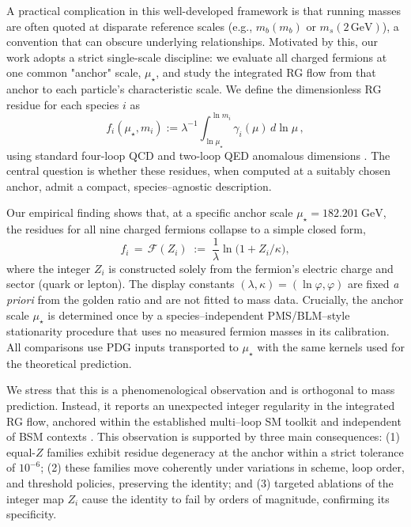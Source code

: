 \documentclass[aps,prd,onecolumn,amsmath,amssymb,superscriptaddress,nofootinbib,showpacs,showkeys]{revtex4-2}
\begin{document}
A practical complication in this well-developed framework is that running masses are often quoted at disparate reference scales (e.g., $m_b(m_b)$ or $m_s(2\,\mathrm{GeV})$), a convention that can obscure underlying relationships. Motivated by this, our work adopts a strict single-scale discipline: we evaluate all charged fermions at one common "anchor" scale, $\mu_\star$, and study the integrated RG flow from that anchor to each particle's characteristic scale. We define the dimensionless RG residue for each species $i$ as
\[
f_i(\mu_\star,m_i):=\lambda^{-1}\!\int_{\ln\mu_\star}^{\ln m_i}\gamma_i(\mu)\,d\ln\mu\,,
\]
using standard four-loop QCD and two-loop QED anomalous dimensions \cite{VermaserenLarinRitbergen97,vanRitbergenVermaserenLarin97,MachacekVaughn83,LuoWangXiao2003,RunDec3}. The central question is whether these residues, when computed at a suitably chosen anchor, admit a compact, species–agnostic description.

Our empirical finding shows that, at a specific anchor scale $\mu_\star=182.201~\mathrm{GeV}$,
the residues for all nine charged fermions collapse to a simple closed form,
\[
f_i\,=\,\mathcal F(Z_i)\;:=\;\frac{1}{\lambda}\ln\!\bigl(1+Z_i/\kappa\bigr),
\]
where the integer $Z_i$ is constructed solely from the fermion's electric charge and sector (quark or lepton).
The display constants $(\lambda,\kappa)=(\ln\varphi,\varphi)$ are fixed \emph{a priori}
from the golden ratio and are not fitted to mass data. Crucially, the anchor scale $\mu_\star$
is determined once by a species–independent PMS/BLM–style stationarity procedure that uses no measured fermion
masses in its calibration. All comparisons use PDG inputs transported to $\mu_\star$ with the
same kernels used for the theoretical prediction. %

We stress that this is a phenomenological observation %
and is orthogonal to mass prediction. Instead, it reports an unexpected integer regularity in the
integrated RG flow, anchored within the established multi–loop SM toolkit and independent of BSM contexts \cite{Kitahara2020}.
This observation is supported by three main consequences: (1) equal-$Z$ families exhibit residue degeneracy at the anchor within a strict tolerance of $10^{-6}$; (2) these families move coherently under variations in scheme, loop order, and threshold policies, preserving the identity; and (3) targeted ablations of the integer map $Z_i$ cause the identity to fail by orders of magnitude, confirming its specificity. 
\end{document}
